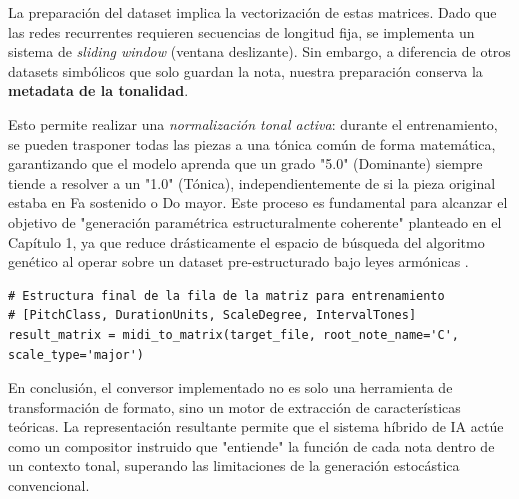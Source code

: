 La preparación del dataset implica la vectorización de estas matrices. Dado que las redes recurrentes requieren secuencias de longitud fija, se implementa un sistema de \textit{sliding window} (ventana deslizante). Sin embargo, a diferencia de otros datasets simbólicos que solo guardan la nota, nuestra preparación conserva la \textbf{metadata de la tonalidad}. 

Esto permite realizar una \textit{normalización tonal activa}: durante el entrenamiento, se pueden trasponer todas las piezas a una tónica común de forma matemática, garantizando que el modelo aprenda que un grado "5.0" (Dominante) siempre tiende a resolver a un "1.0" (Tónica), independientemente de si la pieza original estaba en Fa sostenido o Do mayor. Este proceso es fundamental para alcanzar el objetivo de "generación paramétrica estructuralmente coherente" planteado en el Capítulo 1, ya que reduce drásticamente el espacio de búsqueda del algoritmo genético al operar sobre un dataset pre-estructurado bajo leyes armónicas \cite{hadjeres2017deepbach}.

\begin{verbatim}
# Estructura final de la fila de la matriz para entrenamiento
# [PitchClass, DurationUnits, ScaleDegree, IntervalTones]
result_matrix = midi_to_matrix(target_file, root_note_name='C', scale_type='major')
\end{verbatim}

En conclusión, el conversor implementado no es solo una herramienta de transformación de formato, sino un motor de extracción de características teóricas. La representación resultante permite que el sistema híbrido de IA actúe como un compositor instruido que "entiende" la función de cada nota dentro de un contexto tonal, superando las limitaciones de la generación estocástica convencional.
